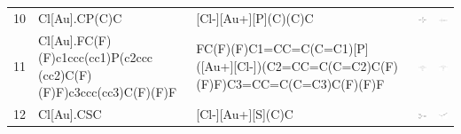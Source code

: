 \begin{landscape}
\begin{longtable}{m{0.3cm}m{6.7cm}m{7.7cm}m{2.3cm}m{2.3cm}}
 10 &
 Cl[Au].CP(C)C & 
 [Cl-][Au+][P](C)(C)C & 
 \includegraphics[width=2.2cm]{imagenes/sigmaAldrich/Chloro(trimethylphosphine)gold(I).png} & 
 \includegraphics[width=2.2cm]{imagenes/sciFinder/pdf/Chloro(trimethylphosphine)gold(I).pdf} \\


 11 &
 Cl[Au].FC(F)(F)c1ccc(cc1)P(c2ccc (cc2)C(F)(F)F)c3ccc(cc3)C(F)(F)F & 
 FC(F)(F)C1=CC=C(C=C1)[P] ([Au+][Cl-])(C2=CC=C(C=C2)C(F) (F)F)C3=CC=C(C=C3)C(F)(F)F & 
 \includegraphics[width=2.2cm]{imagenes/sigmaAldrich/Chloro[tris(para-trifluoromethylphenyl)phosphine]gold(I).png} & 
 \includegraphics[width=2.2cm]{imagenes/sciFinder/pdf/Chloro[tris(para-trifluoromethylphenyl)phosphine]gold(I).pdf} \\



 12 &
 Cl[Au].CSC & 
 [Cl-][Au+][S](C)C & 
 \includegraphics[width=2.2cm]{imagenes/sigmaAldrich/Chloro(dimethylsulfide)gold(I).png} & 
 \includegraphics[width=2.2cm]{imagenes/sciFinder/pdf/Chloro(dimethylsulfide)gold(I).pdf} \\




\end{longtable}
\end{landscape}

